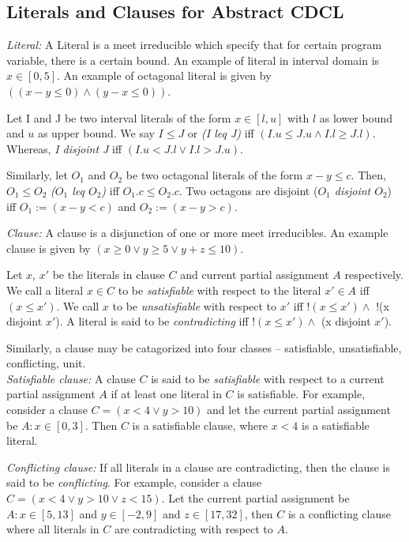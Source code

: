 \subsection{Literals and Clauses for Abstract CDCL}
%
\textit{Literal:} A Literal is a meet irreducible which specify that 
for certain program variable, there is a certain bound. An example of 
literal in interval domain is $x \in [0,5]$. An example of octagonal 
literal is given by $((x-y \leq 0) \wedge (y-x \leq 0))$.

Let I and J be two interval literals of the form $x \in [l, u]$ with $l$ 
as lower bound and $u$ as upper bound. We say $I \leq J$ or {\em (I leq J)} 
iff $(I.u \leq J.u \wedge I.l \geq J.l)$.  Whereas, {\em I disjoint J} iff 
$(I.u < J.l \vee  I.l > J.u)$. 

Similarly, let $O_1$ and $O_2$ be two octagonal literals of the form 
$x-y \leq c$.  Then, $O_1 \leq O_2$ {\em ($O_1$ leq $O_2$)} iff 
$O_1.c \leq O_2.c$.  Two octagons are disjoint ({\em $O_1$ disjoint $O_2$}) 
iff $O_1:= (x-y < c)$ and $O_2:= (x-y > c)$.  

\textit{Clause:} A clause is a disjunction of one or more meet irreducibles. 
An example clause is given by $(x \geq 0 \vee y \geq 5 \vee y+z \leq 10)$.

Let $x$, $x'$ be the literals in clause $C$ and current partial assignment 
$A$ respectively.  We call a literal $x \in C$ to be {\em satisfiable} with 
respect to the literal $x' \in A$ iff $(x \leq x')$.  We call $x$ to be  
{\em unsatisfiable} with respect to $x'$ iff $!(x \leq x') \wedge$ $!$(x disjoint $x'$).
A literal is said to be {\em contradicting} iff $!(x \leq x') \wedge$ (x disjoint $x'$).

Similarly, a clause may be catagorized into four classes -- satisfiable,
unsatisfiable, conflicting, unit. \\ 
\textit{Satisfiable clause:}
A clause $C$ is said to be {\em satisfiable} with respect to a current partial 
assignment $A$ if at least one literal in $C$ is satisfiable. For example, 
consider a clause $C=(x<4 \vee y>10)$ and let the current partial assignment 
be $A: x \in [0,3]$. Then $C$ is a satisfiable clause, where $x<4$ is a
satisfiable literal. 

\textit{Conflicting clause:}
If all literals in a clause are contradicting, then the clause is said to
be {\em conflicting}. For example, consider a clause $C=(x<4 \vee y>10 \vee z<15)$. 
Let the current partial assignment be $A: x \in [5,13]$ and $y \in [-2,9]$ and $z \in
[17,32]$, then $C$ is a conflicting clause where all literals in $C$ are
contradicting with respect to $A$. 

